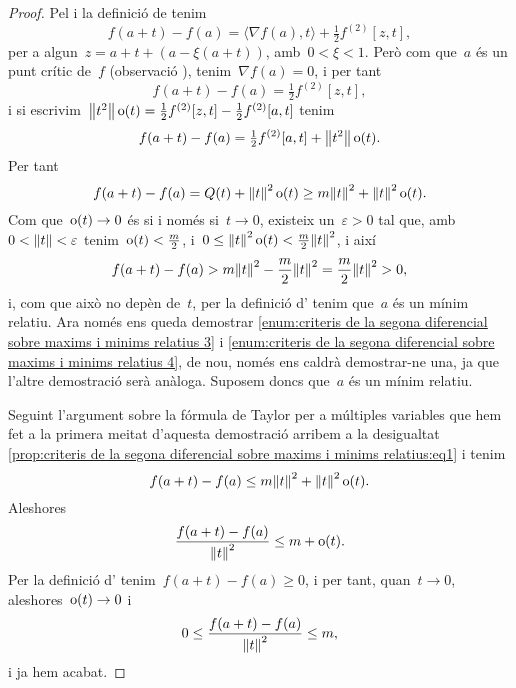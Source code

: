 \documentclass[../../main.tex]{subfiles}
\begin{document}
\begin{proof}
        Pel  i la definició de  tenim
        \[
            f(a+t)-f(a)=\langle\nabla f(a),t\rangle+\tfrac{1}{2}f^{(2)}[z,t],
        \]
        per a algun~\(z=a+t+(a-\xi(a+t))\), amb~\(0<\xi<1\).
        Però com que~\(a\) és un punt crític de~\(f\) (observació ), tenim~\(\nabla f(a)=0\), i per tant
        \[
            f(a+t)-f(a)=\tfrac{1}{2}f^{(2)}[z,t],
        \]
        i si escrivim~\(\norm{t^{2}}\omicron(t)=\frac{1}{2}f^{(2)}[z,t]-\frac{1}{2}f^{(2)}[a,t]\) tenim
        \[
            f(a+t)-f(a)=\tfrac{1}{2}f^{(2)}[a,t]+\norm{t^{2}}\omicron(t).
        \]
        Per tant
        \begin{equation}\label{prop:criteris de la segona diferencial sobre maxims i minims relatius:eq1}
        f(a+t)-f(a)=Q(t)+\norm{t}^{2}\omicron(t)\geq m\norm{t}^{2}+\norm{t}^{2}\omicron(t).
        \end{equation}
        Com que~\(\operatorname{o}(t)\to0\) és si i només si~\(t\to0\), existeix un~\(\varepsilon>0\) tal que, amb~\(0<\norm{t}<\varepsilon\) tenim~\(\operatorname{o}(t)<\frac{m}{2}\), i~\(0\leq\norm{t}^{2}\omicron(t)<\frac{m}{2}\norm{t}^{2}\), i així
        \[
            f(a+t)-f(a)>m\norm{t}^{2}-\frac{m}{2}\norm{t}^{2}=\frac{m}{2}\norm{t}^{2}>0,
        \]
        i, com que això no depèn de~\(t\), per la definició d' tenim que~\(a\) és un mínim relatiu.
        Ara només ens queda demostrar \eqref{enum:criteris de la segona diferencial sobre maxims i minims relatius 3} i \eqref{enum:criteris de la segona diferencial sobre maxims i minims relatius 4}, de nou, només ens caldrà demostrar-ne una, ja que l'altre demostració serà anàloga.
        Suposem doncs que~\(a\) és un mínim relatiu.

        Seguint l'argument sobre la fórmula de Taylor per a múltiples variables que hem fet a la primera meitat d'aquesta demostració arribem a la desigualtat \eqref{prop:criteris de la segona diferencial sobre maxims i minims relatius:eq1} i tenim
        \[
            f(a+t)-f(a)\leq m\norm{t}^{2}+\norm{t}^{2}\omicron(t).
        \]
        Aleshores
        \[
            \frac{f(a+t)-f(a)}{\norm{t}^{2}}\leq m+\omicron(t).
        \]
        Per la definició d' tenim~\(f(a+t)-f(a)\geq0\), i per tant, quan~\(t\to0\), aleshores~\(\operatorname{o}(t)\to0\) i
        \[
            0\leq\frac{f(a+t)-f(a)}{\norm{t}^{2}}\leq m,
        \]
        i ja hem acabat.
    \end{proof}
\end{document}
